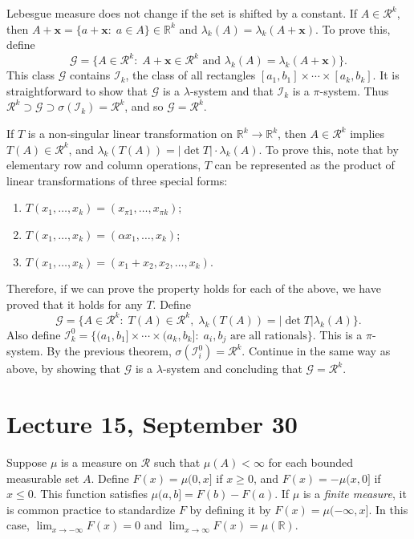 \documentclass[11pt,fleqn]{book} %
\begin{document}
Lebesgue measure does not change if the set is shifted by a constant. If $A \in \mathcal{R}^k$, then $A+\bm{x} = \{a+\bm{x}:\;a \in A\} \in \mathbb{R}^k$ and $\lambda_k(A) = \lambda_k(A+\bm{x})$. To prove this, define
\[
	\mathcal{G} = \{A \in \mathcal{R}^k:\;A+\bm{x} \in \mathcal{R}^k \textrm{ and } \lambda_k(A) = \lambda_k(A+\bm{x})\}.
\]
This class $\mathcal{G}$ contains $\mathcal{I}_k$, the class of all rectangles $[a_1,b_1] \times \cdots \times [a_k,b_k]$. It is straightforward to show that $\mathcal{G}$ is a $\lambda$-system and that $\mathcal{I}_k$ is a $\pi$-system. Thus $\mathcal{R}^k \supset \mathcal{G} \supset \sigma(\mathcal{I}_k) = \mathcal{R}^k$, and so $\mathcal{G} = \mathcal{R}^k$.

If $T$ is a non-singular linear transformation on $\mathbb{R}^k \to \mathbb{R}^k$, then $A \in \mathcal{R}^k$ implies $T(A) \in \mathcal{R}^k$, and $\lambda_k(T(A)) = |\det T| \cdot \lambda_k(A)$. To prove this, note that by elementary row and column operations, $T$ can be represented as the product of linear transformations of three special forms:
\begin{enumerate}[label=(\alph*)]
	\item $T(x_1,\dots,x_k) = (x_{\pi 1},\dots,x_{\pi k})$;
	\item $T(x_1,\dots,x_k) = (\alpha x_1,\dots,x_k)$;
	\item $T(x_1,\dots,x_k) = (x_1+x_2, x_2,\dots,x_k)$.
\end{enumerate}
Therefore, if we can prove the property holds for each of the above, we have proved that it holds for any $T$. Define
\[
	\mathcal{G} = \{A \in \mathcal{R}^k:\;T(A) \in \mathcal{R}^k,\;\lambda_k(T(A)) = |\det T| \lambda_k(A)\}.
\]
Also define $\mathcal{I}_k^0 = \{(a_1,b_1] \times \cdots \times (a_k,b_k]:\;a_i,b_j \textrm{ are all rationals}\}.$ This is a $\pi$-system. By the previous theorem, $\sigma(\mathcal{I}_i^0) = \mathcal{R}^k$. Continue in the same way as above, by showing that $\mathcal{G}$ is a $\lambda$-system and concluding that $\mathcal{G} = \mathcal{R}^k$.

\section{Lecture 15, September 30}

Suppose $\mu$ is a measure on $\mathcal{R}$ such that $\mu(A) < \infty$ for each bounded measurable set $A$. Define $F(x) = \mu(0,x]$ if $x \geq 0$, and $F(x) = -\mu(x,0]$ if $x \leq 0$. This function satisfies $\mu(a,b] = F(b)-F(a)$. If $\mu$ is a \emph{finite measure}, it is common practice to standardize $F$ by defining it by $F(x) = \mu(-\infty,x]$. In this case, $\lim_{x \to -\infty} F(x) = 0$ and $\lim_{x \to \infty} F(x) = \mu(\mathbb{R})$.
\end{document}
